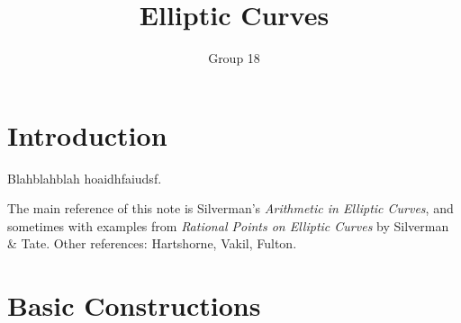 \documentclass[12pt]{article}
\title{Elliptic Curves}
\author{Group 18}
\theoremstyle{remark}
\theoremstyle{definition}
\begin{document}
    \maketitle
    \tableofcontents
    \newpage
    \section{Introduction}
        Blahblahblah hoaidhfaiudsf.    

        The main reference of this note is Silverman's \textit{Arithmetic in Elliptic Curves}, and sometimes with examples from \textit{Rational Points on Elliptic Curves} by Silverman \& Tate. Other references: Hartshorne, Vakil, Fulton.
    \section{Basic Constructions}
\end{document}
